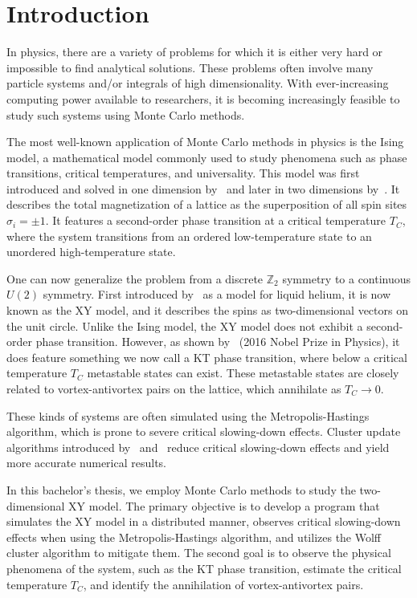 \chapter{Introduction}\label{chap:introduction}
	In physics, there are a variety of problems for which it is either very hard or impossible to find analytical solutions. These problems often involve many particle systems and/or integrals of high dimensionality. With ever-increasing computing power available to researchers, it is becoming increasingly feasible to study such systems using Monte Carlo methods.
	
	The most well-known application of Monte Carlo methods in physics is the Ising model, a mathematical model commonly used to study phenomena such as phase transitions, critical temperatures, and universality. This model was first introduced and solved in one dimension by~\cite{ising} and later in two dimensions by~\cite{onsager}. It describes the total magnetization of a lattice as the superposition of all spin sites $\sigma_i = \pm 1$. It features a second-order phase transition at a critical temperature $T_C$, where the system transitions from an ordered low-temperature state to an unordered high-temperature state.
	
	One can now generalize the problem from a discrete $\mathbb{Z}_2$ symmetry to a continuous $U(2)$ symmetry. First introduced by~\cite{matsubara} as a model for liquid helium, it is now known as the XY model, and it describes the spins as two-dimensional vectors on the unit circle. Unlike the Ising model, the XY model does not exhibit a second-order phase transition. However, as shown by~\cite{kosterlitz} (2016 Nobel Prize in Physics), it does feature something we now call a KT phase transition, where below a critical temperature $T_C$ metastable states can exist. These metastable states are closely related to vortex-antivortex pairs on the lattice, which annihilate as $T_C \rightarrow 0$.
	
	These kinds of systems are often simulated using the Metropolis-Hastings algorithm, which is prone to severe critical slowing-down effects. Cluster update algorithms introduced by~\cite{sw} and~\cite{wolff} reduce critical slowing-down effects and yield more accurate numerical results.
	
	In this bachelor's thesis, we employ Monte Carlo methods to study the two-dimensional XY model. The primary objective is to develop a program that simulates the XY model in a distributed manner, observes critical slowing-down effects when using the Metropolis-Hastings algorithm, and utilizes the Wolff cluster algorithm to mitigate them. The second goal is to observe the physical phenomena of the system, such as the KT phase transition, estimate the critical temperature $T_C$, and identify the annihilation of vortex-antivortex pairs.
	